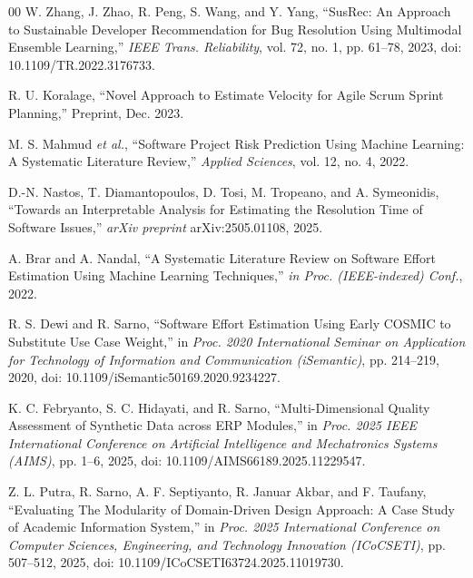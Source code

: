\documentclass[conference]{IEEEtran}
\begin{document}
\begin{thebibliography}{00}
W. Zhang, J. Zhao, R. Peng, S. Wang, and Y. Yang,
``SusRec: An Approach to Sustainable Developer Recommendation for Bug Resolution Using Multimodal Ensemble Learning,''
\textit{IEEE Trans. Reliability}, vol. 72, no. 1, pp. 61--78, 2023,
doi: 10.1109/TR.2022.3176733.


R. U. Koralage, ``Novel Approach to Estimate Velocity for Agile Scrum Sprint Planning,''
Preprint, Dec. 2023.

M. S. Mahmud \textit{et al.}, ``Software Project Risk Prediction Using Machine Learning: A Systematic Literature Review,''
\textit{Applied Sciences}, vol. 12, no. 4, 2022.

D.-N. Nastos, T. Diamantopoulos, D. Tosi, M. Tropeano, and A. Symeonidis,
``Towards an Interpretable Analysis for Estimating the Resolution Time of Software Issues,''
\textit{arXiv preprint} arXiv:2505.01108, 2025.

A. Brar and A. Nandal,
``A Systematic Literature Review on Software Effort Estimation Using Machine Learning Techniques,''
\textit{in Proc. (IEEE-indexed) Conf.}, 2022.

R. S. Dewi and R. Sarno, ``Software Effort Estimation Using Early COSMIC to Substitute Use Case Weight,''
in \textit{Proc. 2020 International Seminar on Application for Technology of Information and Communication (iSemantic)},
pp. 214--219, 2020, doi: 10.1109/iSemantic50169.2020.9234227.

K. C. Febryanto, S. C. Hidayati, and R. Sarno, ``Multi-Dimensional Quality Assessment of Synthetic Data across ERP Modules,''
in \textit{Proc. 2025 IEEE International Conference on Artificial Intelligence and Mechatronics Systems (AIMS)},
pp. 1--6, 2025, doi: 10.1109/AIMS66189.2025.11229547.

Z. L. Putra, R. Sarno, A. F. Septiyanto, R. Januar Akbar, and F. Taufany,
``Evaluating The Modularity of Domain-Driven Design Approach: A Case Study of Academic Information System,''
in \textit{Proc. 2025 International Conference on Computer Sciences, Engineering, and Technology Innovation (ICoCSETI)},
pp. 507--512, 2025, doi: 10.1109/ICoCSETI63724.2025.11019730.

\end{thebibliography}
\end{document}
